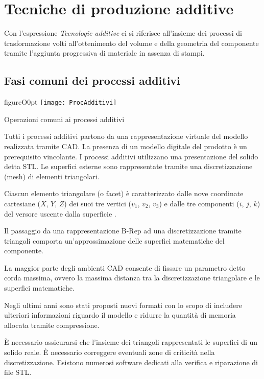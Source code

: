 \chapter{Tecniche di produzione additive}\label{chp:TecnicheAdditive}
Con l'espressione \emph{Tecnologie additive} ci si riferisce all'insieme dei processi di trasformazione volti all'ottenimento del volume e della geometria del componente tramite l'aggiunta progressiva di materiale in assenza di stampi.

\section{Fasi comuni dei processi additivi}

\begin{wrapfloat}{figure}{O}{0pt}
\texttt{[image: ProcAdditivi]}
\caption{Operazioni comuni ai processi additivi}
\label{fig:ProcAdditivi}
\end{wrapfloat}

Tutti i processi additivi partono da una rappresentazione virtuale del modello realizzata tramite \ac{CAD}.
La presenza di un modello digitale del prodotto è un prerequisito vincolante.
I processi additivi utilizzano una presentazione del solido detta \ac{STL}.
Le superfici esterne sono rappresentate tramite una discretizzazione (mesh) di elementi triangolari.

Ciascun elemento triangolare (o facet) è caratterizzato dalle nove coordinate cartesiane ($X$, $Y$, $Z$) dei suoi tre vertici ($v_1$, $v_2$, $v_3$) e dalle tre componenti ($i$, $j$, $k$) del versore uscente dalla superficie .

Il passaggio da una rappresentazione B-Rep ad una discretizzazione tramite triangoli comporta un'approssimazione delle superfici matematiche del componente.

La maggior parte degli ambienti \ac{CAD} consente di fissare un parametro detto corda massima, ovvero la massima distanza tra la discretizzazione triangolare e le superfici matematiche.

Negli ultimi anni sono stati proposti nuovi formati con lo scopo di includere ulteriori informazioni riguardo il modello e ridurre la quantità di memoria allocata tramite compressione.

È necessario assicurarsi che l'insieme dei triangoli rappresentati le superfici di un solido reale.
È necessario correggere eventuali zone di criticità nella discretizzazione.
Esistono numerosi software dedicati alla verifica e riparazione di file \ac{STL}.

